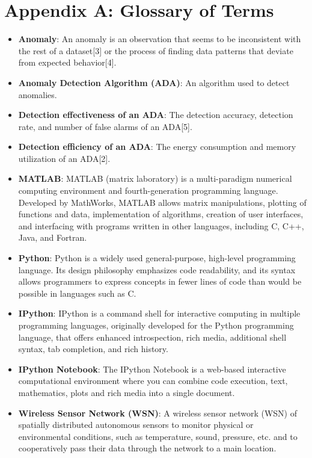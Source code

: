 \documentclass[twoside]{article}
\begin{document}

\section{Appendix A: Glossary of Terms}

\begin{itemize}
	\item \textbf{Anomaly}: An anomaly is an observation that seems to be inconsistent with the rest of a dataset[3] or the process of finding data patterns that deviate from expected behavior[4].
	\item \textbf{Anomaly Detection Algorithm (ADA)}: An algorithm used to detect anomalies.
	\item \textbf{Detection effectiveness of an ADA}: The detection accuracy, detection rate, and number of false alarms of an ADA[5].
	\item \textbf{Detection efficiency of an ADA}: The energy consumption and memory utilization of an ADA[2].
	\item \textbf{MATLAB}: MATLAB (matrix laboratory) is a multi-paradigm numerical computing environment and fourth-generation programming language. Developed by MathWorks, MATLAB allows matrix manipulations, plotting of functions and data, implementation of algorithms, creation of user interfaces, and interfacing with programs written in other languages, including C, C++, Java, and Fortran.
	\item \textbf{Python}: Python is a widely used general-purpose, high-level programming language. Its design philosophy emphasizes code readability, and its syntax allows programmers to express concepts in fewer lines of code than would be possible in languages such as C.
	\item \textbf{IPython}: IPython is a command shell for interactive computing in multiple programming languages, originally developed for the Python programming language, that offers enhanced introspection, rich media, additional shell syntax, tab completion, and rich history.
	\item \textbf{IPython Notebook}: The IPython Notebook is a web-based interactive computational environment where you can combine code execution, text, mathematics, plots and rich media into a single document.
	\item \textbf{Wireless Sensor Network (WSN)}: A wireless sensor network (WSN) of spatially distributed autonomous sensors to monitor physical or environmental conditions, such as temperature, sound, pressure, etc. and to cooperatively pass their data through the network to a main location.

\end{itemize}
\end{document}

